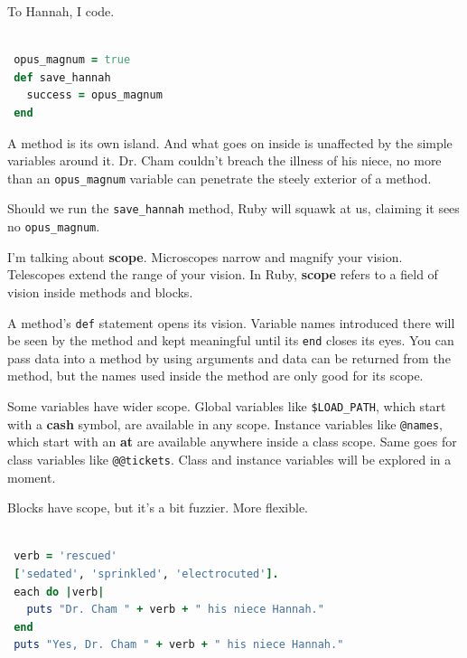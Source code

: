 \documentclass[10pt,twoside]{report}
\begin{document}
To Hannah, I code.


\begin{lstlisting}[basicstyle=\ttfamily\color{basiccolor},
    commentstyle = \ttfamily\color{commentcolor},
    keywordstyle=\ttfamily\color{keywordscolor},
    stringstyle=\color{stringcolor},
    language=Ruby,
    basicstyle=\small\ttfamily,
    showstringspaces=false,
  ]

 opus_magnum = true
 def save_hannah
   success = opus_magnum
 end

\end{lstlisting}


A method is its own island.  And what goes on inside is unaffected by
the simple variables around it. Dr. Cham couldn't breach the illness
of his niece, no more than an \lstinline[breaklines=true]|opus_magnum|
variable can penetrate the steely exterior of a method.

Should we run the \lstinline[breaklines=true]|save_hannah| method,
Ruby will squawk at us, claiming it sees no
\lstinline[breaklines=true]|opus_magnum|.

I'm talking about {\bf scope}.  Microscopes narrow and magnify your
vision.  Telescopes extend the range of your vision.  In Ruby, {\bf
  scope} refers to a field of vision inside methods and blocks.

A method's \lstinline[breaklines=true]|def| statement opens its
vision.  Variable names introduced there will be seen by the method
and kept meaningful until its \lstinline[breaklines=true]|end| closes
its eyes.  You can pass data into a method by using arguments and data
can be returned from the method, but the names used inside the method
are only good for its scope.

Some variables have wider scope.  Global variables like
\lstinline[breaklines=true]|$LOAD_PATH|, which start with a {\bf cash}
symbol, are available in any scope.  Instance variables like
\lstinline[breaklines=true]|@names|, which start with an {\bf at} are
available anywhere inside a class scope.  Same goes for class
variables like \lstinline[breaklines=true]|@@tickets|. Class and
instance variables will be explored in a moment.

Blocks have scope, but it's a bit fuzzier.  More flexible.


\begin{lstlisting}[basicstyle=\ttfamily\color{basiccolor},
    commentstyle = \ttfamily\color{commentcolor},
    keywordstyle=\ttfamily\color{keywordscolor},
    stringstyle=\color{stringcolor},
    language=Ruby,
    basicstyle=\small\ttfamily,
    showstringspaces=false,
  ]

 verb = 'rescued'
 ['sedated', 'sprinkled', 'electrocuted'].
 each do |verb|
   puts "Dr. Cham " + verb + " his niece Hannah."
 end
 puts "Yes, Dr. Cham " + verb + " his niece Hannah."

\end{lstlisting}
\end{document}
